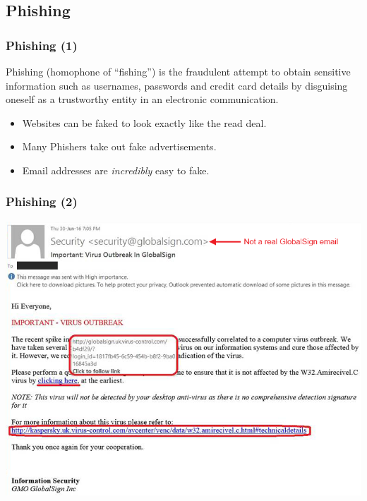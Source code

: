 \documentclass[aspectratio=169,dvipsnames]{beamer}
\begin{document}
\subsection{Phishing}

\begin{frame}
\frametitle{Phishing (1)}
Phishing (homophone of ``fishing'') is the fraudulent attempt to obtain sensitive information such as usernames, passwords and credit card details by disguising oneself as a trustworthy entity in an electronic communication.
\pause\bigskip

\begin{itemize}
\pause\item Websites can be faked to look exactly like the read deal.
\pause\item Many Phishers take out fake advertisements.
\pause\item Email addresses are \emph{incredibly} easy to fake.
\end{itemize}
\end{frame}

\begin{frame}
\frametitle{Phishing (2)}
\begin{center}
\includegraphics[scale=0.45]{images/phishing.png} 
\end{center}
\end{frame}
\end{document}
